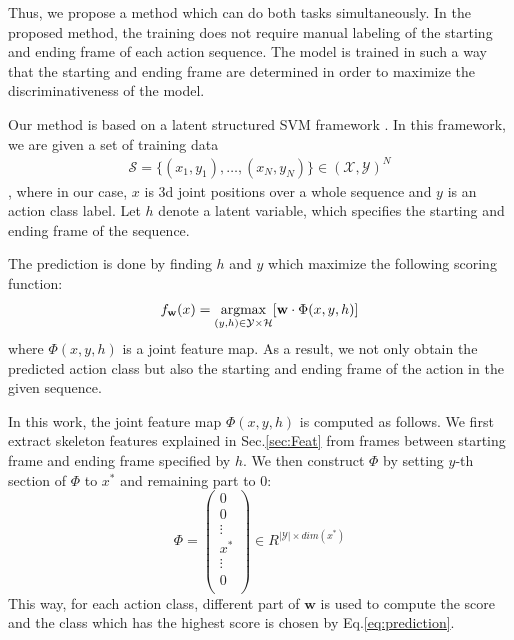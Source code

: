 \documentclass[10pt,twocolumn,letterpaper]{article}
\newcommand{\argmax}{\operatornamewithlimits{argmax}}
\begin{document}
Thus, we propose a method which can do both tasks simultaneously. In the proposed method, the training does not require manual labeling of the starting and ending frame of each action sequence. The model is trained in such a way that the starting and ending frame are determined in order to maximize the discriminativeness of the model. 

Our method is based on a latent structured SVM framework \cite{LatentSVM}. In this framework, we are given a set of training data
\begin{align*}
\mathcal{S}=\{(x_1,y_1),\dots,(x_N,y_N)\} \in (\mathcal{X},\mathcal{Y})^N
\end{align*},
where in our case, $x$ is 3d joint positions over a whole sequence and $y$ is an action class label.
Let $h$ denote a latent variable, which specifies the starting and ending frame of the sequence.

The prediction is done by finding $h$ and $y$ which maximize the following scoring function:
\begin{align}\label{eq:prediction}
f_{\mathbf{w}}(x) = \argmax_{(y,h) \in \mathcal{Y} \times \mathcal{H}} [ \mathbf{w} \cdot \Phi(x,y,h)]
\end{align}
where $\Phi(x,y,h)$ is a joint feature map. As a result, we not only obtain the predicted action class but also the starting and ending frame of the action in the given sequence.

In this work, the joint feature map $\Phi(x,y,h)$ is computed as follows. We first extract skeleton features explained in Sec.\ref{sec:Feat} from frames between starting frame and ending frame specified by $h$. We then construct $\Phi$ by setting $y$-th section of $\Phi$ to $x^{*}$ and remaining part to 0:
\begin{equation}\label{M}
\Phi =
\begin{pmatrix}
  0  \\
  0  \\
  \vdots \\
  x^* \\
  \vdots \\
    0   \\
\end{pmatrix}
\in R^{ |\mathcal{Y}| \times dim(x^*)}
\end{equation}
This way, for each action class, different part of $\mathbf{w}$ is used to compute the score and the class which has the highest score is chosen by Eq.\ref{eq:prediction}.
\end{document}
